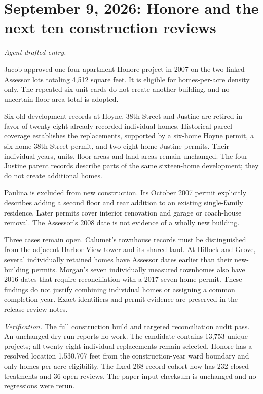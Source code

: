 \clearpage
\section*{September 9, 2026: Honore and the next ten construction reviews}
\textit{Agent-drafted entry.}

Jacob approved one four-apartment Honore project in 2007 on the two linked Assessor lots totaling 4,512 square feet. It is eligible for homes-per-acre density only. The repeated six-unit cards do not create another building, and no uncertain floor-area total is adopted.

Six old development records at Hoyne, 38th Street and Justine are retired in favor of twenty-eight already recorded individual homes. Historical parcel coverage establishes the replacements, supported by a six-home Hoyne permit, a six-home 38th Street permit, and two eight-home Justine permits. Their individual years, units, floor areas and land areas remain unchanged. The four Justine parent records describe parts of the same sixteen-home development; they do not create additional homes.

Paulina is excluded from new construction. Its October 2007 permit explicitly describes adding a second floor and rear addition to an existing single-family residence. Later permits cover interior renovation and garage or coach-house removal. The Assessor's 2008 date is not evidence of a wholly new building.

Three cases remain open. Calumet's townhouse records must be distinguished from the adjacent Harbor View tower and its shared land. At Hillock and Grove, several individually retained homes have Assessor dates earlier than their new-building permits. Morgan's seven individually measured townhomes also have 2016 dates that require reconciliation with a 2017 seven-home permit. These findings do not justify combining individual homes or assigning a common completion year. Exact identifiers and permit evidence are preserved in the release-review notes.

\medskip
\noindent\textit{Verification.} The full construction build and targeted reconciliation audit pass. An unchanged dry run reports no work. The candidate contains 13,753 unique projects; all twenty-eight individual replacements remain selected. Honore has a resolved location 1,530.707 feet from the construction-year ward boundary and only homes-per-acre eligibility. The fixed 268-record cohort now has 232 closed treatments and 36 open reviews. The paper input checksum is unchanged and no regressions were rerun.
